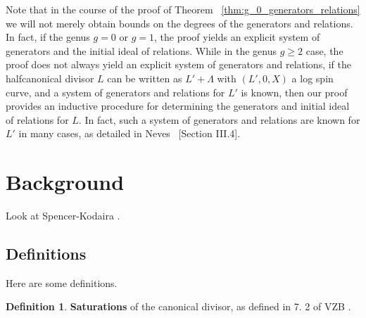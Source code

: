 \documentclass{amsart}
\theoremstyle{plain}
\theoremstyle{definition}
\newtheorem{defn}[thm]{Definition}
\theoremstyle{remark}
\numberwithin{equation}{section}
\newcommand \halfcan{L}
\begin{document}
Note that in the course of the proof of Theorem ~\ref{thm:g_0_generators_relations} we will not merely obtain bounds on the degrees of the generators and relations. In fact, if the genus $g = 0$ or $g = 1$, the proof yields an explicit system of generators and the initial ideal of relations. While in the genus $g \geq 2$ case, the proof does not always yield an explicit system of generators and relations, if the halfcanonical divisor $\halfcan$ can be written as $\halfcan' + \Lambda$ with $(\halfcan',0,X)$ a log spin curve, and a system of generators and relations for $\halfcan'$ is known, then our proof provides an inductive procedure for determining the generators and initial ideal of relations for $\halfcan$. In fact, such a system of generators and relations are known for $\halfcan'$ in many cases, as detailed in Neves ~\cite{neves:halfcan}[Section III.4].
























\section{Background}
Look at Spencer-Kodaira \cite{kodaira:complex-manifolds}.

\subsection{Definitions}
Here are some definitions.

\begin{defn}
\label{defn:sat}
\textbf{Saturations} of the canonical divisor, as defined in 7.
2 of VZB \cite{vzb:stacky}.
\end{defn}











\end{document}
